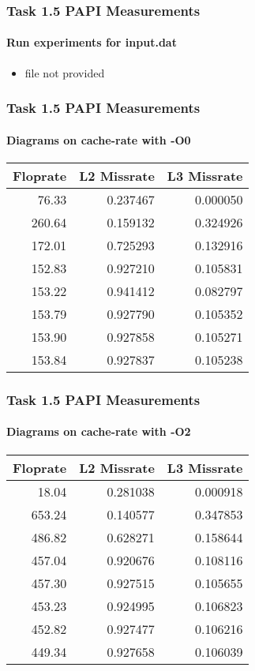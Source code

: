 \begin{frame}
\frametitle{Task 1.5 PAPI Measurements}
\framesubtitle{Run experiments for input.dat}
\begin{itemize}
\item file not provided
\end{itemize}
\end{frame}


\begin{frame}
\frametitle{Task 1.5 PAPI Measurements}
\framesubtitle{Diagrams on cache-rate with -O0}
\begin{center}
 \begin{tabular}{|r r r|} 
 \hline
Floprate & L2 Missrate & L3 Missrate \\ \hline\hline
76.33 & 0.237467 & 0.000050 \\ \hline
260.64 & 0.159132 & 0.324926 \\ \hline
172.01 & 0.725293 & 0.132916 \\ \hline
152.83 & 0.927210 & 0.105831 \\ \hline
153.22 & 0.941412 & 0.082797 \\ \hline
153.79 & 0.927790 & 0.105352 \\ \hline
153.90 & 0.927858 & 0.105271 \\ \hline
153.84 & 0.927837 & 0.105238 \\ \hline
\end{tabular}
\end{center}
\end{frame}

\begin{frame}
\frametitle{Task 1.5 PAPI Measurements}
\framesubtitle{Diagrams on cache-rate with -O2}
\begin{center}
 \begin{tabular}{|r r r|} 
 \hline
Floprate & L2 Missrate & L3 Missrate \\ \hline\hline
18.04 & 0.281038 & 0.000918 \\ \hline
653.24 & 0.140577 & 0.347853 \\ \hline
486.82 & 0.628271 & 0.158644 \\ \hline
457.04 & 0.920676 & 0.108116 \\ \hline
457.30 & 0.927515 & 0.105655 \\ \hline
453.23 & 0.924995 & 0.106823 \\ \hline
452.82 & 0.927477 & 0.106216 \\ \hline
449.34 & 0.927658 & 0.106039 \\ \hline
\end{tabular}
\end{center}
\end{frame}


